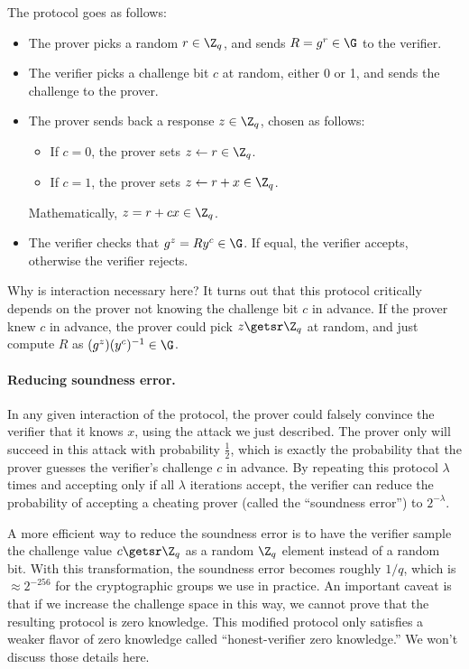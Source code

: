 The protocol goes as follows:
\begin{itemize}

\item The prover picks a random $r\in \Z_q$, and sends $R=g^r\in \G$ to the verifier.

\item The verifier picks a challenge bit $c$ at random, either 0 or 1,
      and sends the challenge to the prover.

\item The prover sends back a response $z \in \Z_q$, chosen as follows: 
  \begin{itemize}
    \item If $c=0$, the prover sets $z \gets r \in \Z_q$.
    \item If $c=1$, the prover sets $z \gets r+x\in \Z_q$.
  \end{itemize}
  Mathematically, $z=r+cx\in \Z_q$.

\item The verifier checks that $g^z=R y^{c}\in \G$.  If equal, the verifier accepts,
  otherwise the verifier rejects.

\end{itemize}

Why is interaction necessary here?
It turns out that this protocol critically depends on the prover 
not knowing the challenge bit $c$
in advance.  If the prover knew $c$ in advance, the prover could pick
$z \getsr \Z_q$ at random, and just compute $R$ as $(g^z)(y^c)^{-1}\in \G$.

\paragraph{Reducing soundness error.}
In any given interaction of the protocol, the prover could falsely
convince the verifier that it knows $x$, using the attack we just
described. The prover only will succeed in this attack with probability $\frac 12$,
which is exactly the probability that the prover guesses the verifier's challenge
$c$ in advance.
By repeating this protocol $\lambda$ times and accepting only if all $\lambda$
iterations accept, the verifier
can reduce the probability of accepting a cheating prover (called the ``soundness
error'') to $2^{-\lambda}$.

A more efficient way to reduce the soundness error is to have 
the verifier sample the challenge value $c \getsr \Z_q$ as a
random $\Z_q$ element instead of a random bit.
With this transformation, the soundness error becomes roughly $1/q$,
which is $\approx 2^{-256}$ for the cryptographic groups we use in practice.
An important caveat is that if we increase the challenge space in this way,
we cannot prove that the resulting protocol is zero knowledge.
This modified protocol only
satisfies a weaker flavor of zero knowledge called ``honest-verifier zero knowledge.''
We won't discuss those details here.



